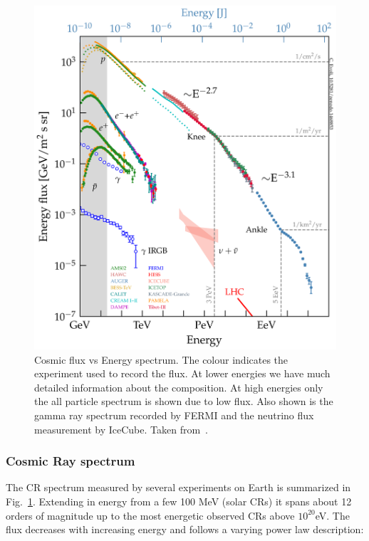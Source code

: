 \begin{figure}[t!]
  \centering
  \includegraphics[width=14.5cm]{thesis_figures/CRnNu/all_particle_spectrum.png}
  \caption{Cosmic flux vs Energy spectrum. The colour indicates the experiment used to record the flux. At lower energies we have much detailed information about the composition. At high energies only the all particle spectrum is shown due to low flux. Also shown is the gamma ray spectrum recorded by FERMI and the neutrino flux measurement by IceCube. Taken from~\cite{evoli_2018_2360277}.}
  \label{fig:CR-spectrum}
\end{figure}
\subsubsection*{Cosmic Ray spectrum}
\label{subsubsec:CRspectrum}
The \gls{CR} spectrum measured by several experiments on Earth is summarized in Fig.~\ref{fig:CR-spectrum}. Extending in energy from a few 100 MeV (solar \glspl{CR}) it spans about 12 orders of magnitude up to the most energetic observed \glspl{CR} above $10^{20}$eV. The flux decreases with increasing energy and follows a varying power law description:


